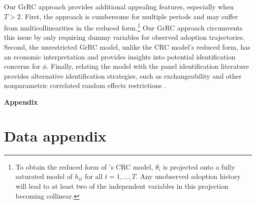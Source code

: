 \documentclass[12pt]{article}
\theoremstyle{plain}
\theoremstyle{definition}
\begin{document}
Our GrRC approach provides additional appealing features, especially when $T>2$. 
First, the \citet{S2011} approach is cumbersome for multiple periods and may suffer from multicollinearities in the reduced form.\footnote{To obtain the reduced form of \citet{S2011}'s CRC model, $\theta_{i}$ is projected onto a fully saturated model of $h_{it}$ for all $t=1,\dots,T$. Any unobserved adoption history will lead to at least two of the independent variables in this projection becoming collinear.}  
Our GrRC approach circumvents this issue by only requiring dummy variables for observed adoption trajectories. 
Second, the unrestricted GrRC model, unlike the CRC model's reduced form, has an economic interpretation and provides insights into potential identification concerns for $\phi$. 
Finally, relating the \citet{S2011} model with the panel identification literature provides alternative identification strategies, such as exchangeability and other nonparametric correlated random effects restrictions \citep{AM2005,BH2009,G2017}.







\newpage



{\centering
}

\newpage



\newpage
\begin{landscape}
    {\centering
    
    }
\end{landscape}


\newpage
\restoregeometry
\appendix
\onehalfspacing


\renewcommand\thefigure{\thesection.\arabic{figure}}
\setcounter{figure}{0}

\renewcommand\thetable{\thesection.\arabic{table}}
\setcounter{table}{0}
\begin{center}\textbf{\huge{Appendix}}\end{center}



\section{Data appendix}\label{app:data}
\end{document}
